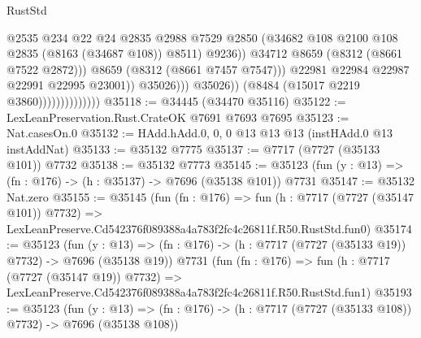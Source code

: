\begin{lexlean}{RustStd}
\begin{coremodule}
                                                  @2535
                                                  @234
                                                  @22
                                                  @24
                                                  @2835
                                                  @2988
                                                  @7529
                                                  @2850
                                                  (@34682
                                                    @108
                                                    @2100
                                                    @108
                                                    @2835
                                                    (@8163 (@34687 @108))
                                                    @8511)
                                                  @9236))
                                              @34712
                                              @8659
                                              (@8312 (@8661 @7522 @2872)))
                                            @8659
                                            (@8312 (@8661 @7457 @7547)))
                                          @22981
                                          @22984
                                          @22987
                                          @22991
                                          @22995
                                          @23001))
                                      @35026)))
                                @35026))
                            (@8484 (@15017 @2219 @3860))))))))))))))
@35118 := @34445 (@34470 @35116)
@35122 := LexLeanPreservation.Rust.CrateOK @7691 @7693 @7695
@35123 := Nat.casesOn.{0}
@35132 := HAdd.hAdd.{0, 0, 0} @13 @13 @13 (instHAdd.{0} @13 instAddNat)
@35133 := @35132 @7775
@35137 := @7717 (@7727 (@35133 @101)) @7732
@35138 := @35132 @7773
@35145 := @35123 (fun (y : @13) => (fn : @176) -> (h : @35137) -> @7696 (@35138 @101)) @7731
@35147 := @35132 Nat.zero
@35155 := @35145
    (fun (fn : @176) =>
    fun (h : @7717 (@7727 (@35147 @101)) @7732) =>
    LexLeanPreserve.Cd542376f089388a4a783f2fc4c26811f.R50.RustStd.fun0)
@35174 := @35123
    (fun (y : @13) => (fn : @176) -> (h : @7717 (@7727 (@35133 @19)) @7732) -> @7696 (@35138 @19))
    @7731
    (fun (fn : @176) =>
    fun (h : @7717 (@7727 (@35147 @19)) @7732) =>
    LexLeanPreserve.Cd542376f089388a4a783f2fc4c26811f.R50.RustStd.fun1)
@35193 := @35123
    (fun (y : @13) => (fn : @176) -> (h : @7717 (@7727 (@35133 @108)) @7732) -> @7696 (@35138 @108))

\end{coremodule}
\end{lexlean}
